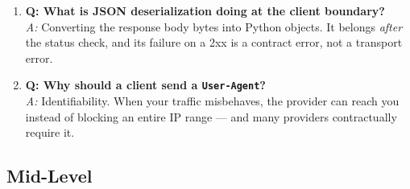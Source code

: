 \begin{enumerate}
  \item \textbf{Q: What is JSON deserialization doing at the client
        boundary?}\\
        \textit{A:} Converting the response body bytes into Python objects.
        It belongs \emph{after} the status check, and its failure on a 2xx is
        a contract error, not a transport error.

  \item \textbf{Q: Why should a client send a \texttt{User-Agent}?}\\
        \textit{A:} Identifiability. When your traffic misbehaves, the
        provider can reach you instead of blocking an entire IP range --- and
        many providers contractually require it.
\end{enumerate}

\subsection{Mid-Level}

